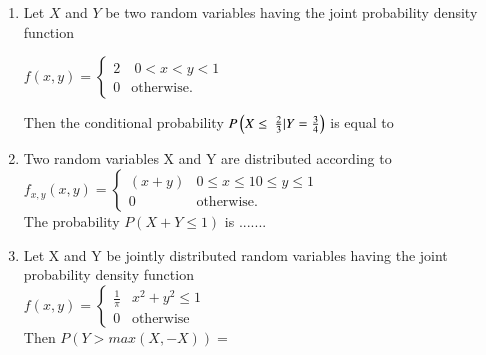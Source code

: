 \renewcommand{\theequation}{\theenumi}
\renewcommand{\thefigure}{\theenumi}
\renewcommand{\thetable}{\theenumi}
\begin{enumerate}[label=\thesection.\arabic*.,ref=\thesection.\theenumi]

\item Let $X$ and $Y$ be two random variables having the joint probability density function

\begin{center}
$ 
f(x,y)=
\begin{cases}
2 &  \ 0<x<y<1 \\
0 & \text{otherwise}.
\end{cases}
$\\ 
\end{center}

Then the conditional probability $P \left(X \leq\ \frac{2}{3} | Y=\frac{3}{4}\right)$ is equal to \underline{\hspace{3cm}}

\begin{enumerate}
\end{enumerate}
\solution


\item Two random variables X and Y are distributed according to\\
{\centering $
f_{x,y}(x,y) = 
\begin{cases}
 (x+y) & 0 \leqslant x \leqslant 1   0 \leqslant y \leqslant 1 \\
 0 & \text{otherwise}.
 \end{cases}
 $ \\}
The probability $P(X+Y \leqslant 1)$ is .......
%


\item Let X and Y be jointly distributed random variables having the joint probability density function \\
$
f(x,y) = 
\begin{cases} 
\frac{1}{\pi} 
&  x^2+y^2 \leqslant 1 \\
0 & \text{otherwise}
\end{cases}
$ \\
Then $P(Y>max(X,-X))=$


\end{enumerate}
